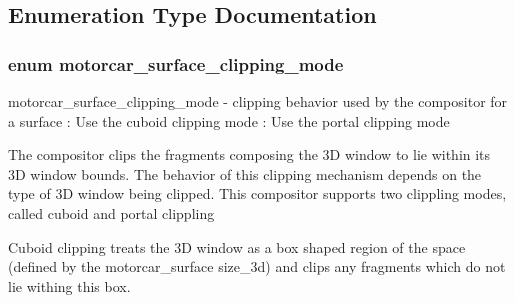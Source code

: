 \subsection{Enumeration Type Documentation}
\hypertarget{motorcar-client-protocol_8h_a4609d9d55b9d8b4d07c8dd85fa4ec19d}{
\subsubsection[{motorcar\-\_\-surface\-\_\-clipping\-\_\-mode}]{\setlength{\rightskip}{0pt plus 5cm}enum {\bf motorcar\-\_\-surface\-\_\-clipping\-\_\-mode}}}\label{motorcar-client-protocol_8h_a4609d9d55b9d8b4d07c8dd85fa4ec19d}
motorcar\-\_\-surface\-\_\-clipping\-\_\-mode -\/ clipping behavior used by the compositor for a surface \-: Use the cuboid clipping mode \-: Use the portal clipping mode

The compositor clips the fragments composing the 3\-D window to lie within its 3\-D window bounds. The behavior of this clipping mechanism depends on the type of 3\-D window being clipped. This compositor supports two clippling modes, called cuboid and portal clippling

Cuboid clipping treats the 3\-D window as a box shaped region of the space (defined by the motorcar\-\_\-surface size\-\_\-3d) and clips any fragments which do not lie withing this box.

